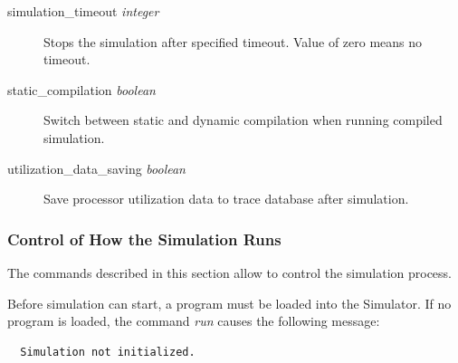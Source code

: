 \documentclass[twoside]{tceusermanual}
\begin{document}
\begin{description}
\item[simulation\_timeout {\emph{integer}}]%
Stops the simulation after specified timeout. Value of zero means no timeout.

\item[static\_compilation {\emph{boolean}}]%
Switch between static and dynamic compilation when running compiled simulation. 


\item[utilization\_data\_saving {\emph{boolean}}]%
Save processor utilization data to trace database after simulation.

\end{description}

\subsubsection{Control of How the Simulation Runs}
\label{ssec:debug-running}

The commands described in this section allow to control the simulation process.

Before simulation can start, a program must be loaded into the Simulator.
If no program is loaded, the command \emph{run} causes the following
message:
\begin{verbatim}
  Simulation not initialized.
\end{verbatim}
\end{document}
